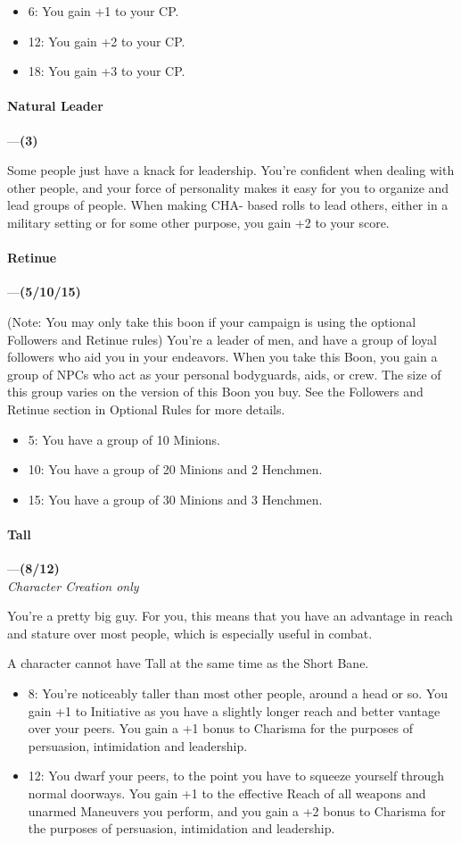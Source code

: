 \documentclass[oneside,11pt,english]{book}
\begin{document}
\begin{itemize}
\item 6: You gain +1 to your CP. 
\item 12: You gain +2 to your CP. 
\item 18: You gain +3 to your CP. 
\end{itemize}
\paragraph{\label{boon:Natural Leader}Natural Leader}---\quad\textbf{(3) }\par
Some people just have a knack for leadership. You're confident when dealing with other people, and your 
force of personality makes it easy for you to organize and lead groups of people. When making CHA-
based rolls to lead others, either in a military setting or for some other purpose, you gain +2 to your score. 
\paragraph{\label{boon:Retinue}Retinue}---\quad\textbf{(5/10/15) }\par
(Note: You may only take this boon if your campaign is using the optional Followers and Retinue rules) 
You're a leader of men, and have a group of loyal followers who aid you in your endeavors. When you 
take this Boon, you gain a group of NPCs who act as your personal bodyguards, aids, or crew. The size of 
this group varies on the version of this Boon you buy. See the Followers and Retinue section in 
Optional Rules for more details. 
\begin{itemize}
\item 5: You have a group of 10 Minions. 
\item 10: You have a group of 20 Minions and 2 Henchmen. 
\item 15: You have a group of 30 Minions and 3 Henchmen. 
\end{itemize}
\paragraph{\label{boon:Tall}Tall}---\quad\textbf{(8/12) }\\
\textit{Character Creation only}\par
You're a pretty big guy. For you, this means that you have an advantage in reach and stature over most 
people, which is especially useful in combat. 


A character cannot have Tall at the same time as the Short Bane. 
\begin{itemize}
\item 8: You’re noticeably taller than most other people, around a head or so. 
  You gain +1 to Initiative as you have a slightly longer reach and better vantage over your peers. You gain a +1 bonus to Charisma for the purposes of persuasion, intimidation and leadership.
\item 12: You dwarf your peers, to the point you have to squeeze yourself through normal doorways. You gain +1 to the effective Reach of all weapons and unarmed Maneuvers you perform, and you gain a +2 bonus to Charisma for the purposes of persuasion, intimidation and leadership.
\end{itemize}
\end{document}
